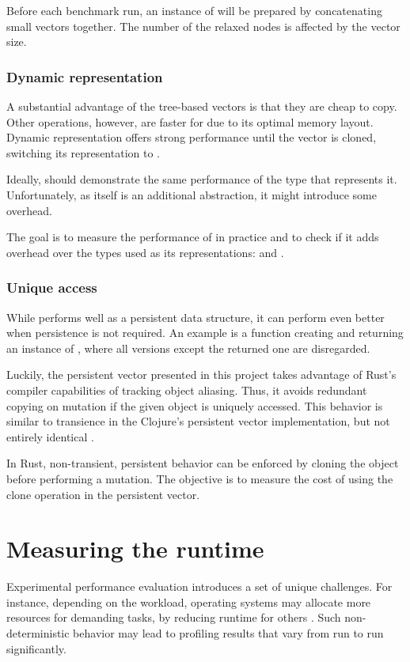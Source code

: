Before each benchmark run, an instance of \rrbvec{} will be prepared by concatenating small vectors together. The number of the relaxed nodes is affected by the vector size.

\subsubsection*{Dynamic representation}
A substantial advantage of the tree-based vectors is that they are cheap to copy. Other operations, however, are faster for \stdvec{} due to its optimal memory layout. Dynamic representation offers strong \stdvec{} performance until the vector is cloned, switching its representation to \rrbvec{}.

Ideally, \pvec{} should demonstrate the same performance of the type that represents it. Unfortunately, as \pvec{} itself is an additional abstraction, it might introduce some overhead.

The goal is to measure the performance of \pvec{} in practice and to check if it adds overhead over the types used as its representations: \stdvec{} and \rrbvec{}.

\subsubsection*{Unique access}
While \rrbvec{} performs well as a persistent data structure, it can perform even better when persistence is not required. An example is a function creating and returning an instance of \rrbvec{}, where all versions except the returned one are disregarded.

Luckily, the persistent vector presented in this project takes advantage of Rust's compiler capabilities of tracking object aliasing. Thus, it avoids redundant copying on mutation if the given object is uniquely accessed. This behavior is similar to transience in the Clojure's persistent vector implementation, but not entirely identical \cite{improving-performance-through-transience}.

In Rust, non-transient, persistent behavior can be enforced by cloning the object before performing a mutation. The objective is to measure the cost of using the clone operation in the persistent vector.

\section{Measuring the runtime}
Experimental performance evaluation introduces a set of unique challenges. For instance, depending on the workload, operating systems may allocate more resources for demanding tasks, by reducing runtime for others \cite{statistically-rigorous-java-performance-evaluation}. Such non-deterministic behavior may lead to profiling results that vary from run to run significantly.

